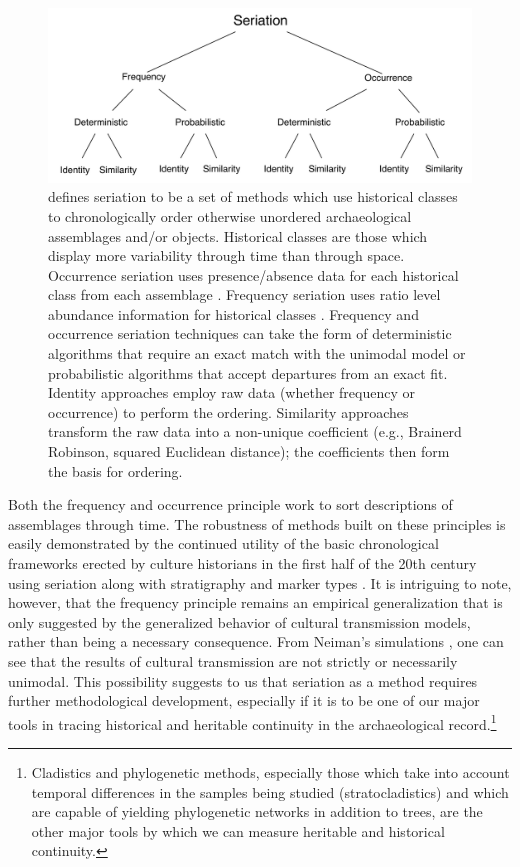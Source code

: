 \begin{figure}[ht]
\centering
\includegraphics[scale=0.6]{graphics/multipleseriation/seriation-methods.pdf}
\caption{\citet{Dunnell1981} defines seriation to be a set of methods which use historical classes to chronologically order otherwise unordered archaeological assemblages and/or objects. Historical classes are those which display more variability through time than through space. Occurrence seriation uses presence/absence data for each historical class from each assemblage \citep{Kroeber1916,Petrie:1899aa}. Frequency seriation uses ratio level abundance information for historical classes \citep{Spier1917,Ford:1935aa,Ford:1962aa}. Frequency and occurrence seriation techniques can take the form of deterministic algorithms that require an exact match with the unimodal model or probabilistic algorithms that accept departures from an exact fit. Identity approaches employ raw data (whether frequency or occurrence) to perform the ordering. Similarity approaches transform the raw data into a non-unique coefficient (e.g., Brainerd Robinson, squared Euclidean distance); the coefficients then form the basis for ordering.}
\label{img:seriation-methods}
\end{figure}

Both the frequency and occurrence principle work to sort descriptions of
assemblages through time. The robustness of methods built on these
principles is easily demonstrated by the continued utility of the basic
chronological frameworks erected by culture historians in the first half
of the 20th century using seriation along with stratigraphy and marker
types \citep{lyman1997rise}. It is intriguing to note, however, that the
frequency principle remains an empirical generalization that is only
suggested by the generalized behavior of cultural transmission models,
rather than being a necessary consequence. From Neiman's simulations
\citep[i.e.,][]{Neiman1995}, one can see that the results of cultural
transmission are not strictly or necessarily unimodal. This possibility
suggests to us that seriation as a method requires further
methodological development, especially if it is to be one of our major
tools in tracing historical and heritable continuity in the
archaeological record.\footnote{Cladistics and phylogenetic methods,
  especially those which take into account temporal differences in the
  samples being studied (stratocladistics) and which are capable of
  yielding phylogenetic networks in addition to trees, are the other
  major tools by which we can measure heritable and historical
  continuity.}

